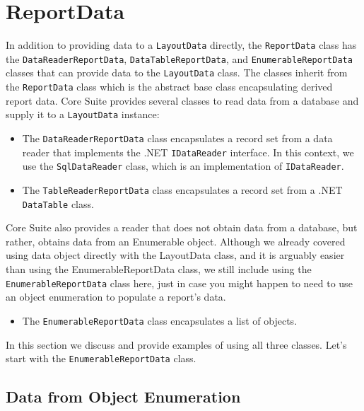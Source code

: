 \documentclass[american]{tufte-book}
\numberwithin{equation}{section}
\numberwithin{figure}{section}
\begin{document}
{{\begin{figure}
\end{figure}


\section{ReportData}

In addition to providing data to a \texttt{LayoutData} directly, the \texttt{ReportData}
class has the \texttt{DataReaderReportData}, \texttt{DataTableReportData}, and \texttt{EnumerableReportData}
classes that can provide data to the \texttt{LayoutData} class. The classes
inherit from the \texttt{ReportData} class which is the abstract base class
encapsulating derived report data. Core Suite provides several classes
to read data from a database and supply it to a \texttt{LayoutData}
instance:
\begin{itemize}
\item The \texttt{DataReaderReportData} class encapsulates a record set
from a data reader that implements the .NET \texttt{IDataReader} interface.
In this context, we use the \texttt{SqlDataReader} class, which is
an implementation of \texttt{IDataReader}.
\item The \texttt{TableReaderReportData} class encapsulates a record set
from a .NET \texttt{DataTable} class.
\end{itemize}
Core Suite also provides a reader that does not obtain data from a
database, but rather, obtains data from an Enumerable object. Although
we already covered using data object directly with the LayoutData
class, and it is arguably easier than using the EnumerableReportData
class, we still include using the \texttt{EnumerableReportData} class here, just in case you might happen to need to use an object
enumeration to populate a report's data.
\begin{itemize}
\item The \texttt{EnumerableReportData} class encapsulates a list of objects.
\end{itemize}
In this section we discuss and provide examples of using all three
classes. Let's start with the \texttt{EnumerableReportData} class.

\subsection{Data from Object Enumeration}

}}
\end{document}

